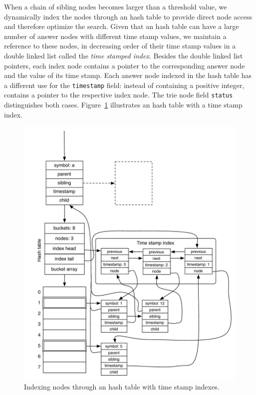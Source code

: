 When a chain of sibling nodes becomes larger than a threshold value, we dynamically index the
nodes through an hash table to provide direct node access and therefore optimize the search. Given
that an hash table can have a large number of answer nodes with different time stamp values, we maintain
a reference to these nodes, in decreasing order of their time stamp values in a double linked list
called the \textit{time stamped index}.
Besides the double linked list pointers, each index node contains a pointer to the corresponding
answer node and the value of its time stamp. Each answer node indexed in the hash table has a different use
for the \texttt{timestamp} field: instead of containing a positive integer, contains a pointer
to the respective index node. The trie node field \texttt{status} distinguishes
both cases. Figure~\ref{fig:hash_table_tst} illustrates an hash table with a time stamp index.

\begin{figure}[ht]
  \centering
    \includegraphics[scale=0.6]{hash_table_tst.pdf}
  \caption{Indexing nodes through an hash table with time stamp indexes.}
  \label{fig:hash_table_tst}
\end{figure}

